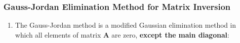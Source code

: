 \documentclass[10pt,compress,handout,ignorenonframetext]{beamer}
\begin{document}
\begin{frame}
  \frametitle{Gauss-Jordan Elimination Method for Matrix Inversion} 
  \begin{enumerate}
     \item <1-> The Gauss-Jordan method is a modified Gaussian elimination method in which all elements of matrix $\bm{A}$ are zero, {\bf except the main diagonal}:


\end{enumerate}
\end{frame}
\end{document}
